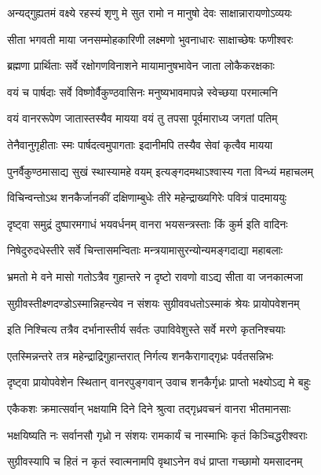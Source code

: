 \twolineshloka
{अन्यद्गुह्यतमं वक्ष्ये रहस्यं शृणु मे सुत}
{रामो न मानुषो देवः साक्षान्नारायणोऽव्ययः} %

\twolineshloka
{सीता भगवती माया जनसम्मोहकारिणी}
{लक्ष्मणो भुवनाधारः साक्षाच्छेषः फणीश्वरः} %

\twolineshloka
{ब्रह्मणा प्रार्थिताः सर्वे रक्षोगणविनाशने}
{मायामानुषभावेन जाता लोकैकरक्षकाः} %

\twolineshloka
{वयं च पार्षदाः सर्वे विष्णोर्वैकुण्ठवासिनः}
{मनुष्यभावमापन्ने स्वेच्छया परमात्मनि} %

\twolineshloka
{वयं वानररूपेण जातास्तस्यैव मायया}
{वयं तु तपसा पूर्वमाराध्य जगतां पतिम्} %

\twolineshloka
{तेनैवानुगृहीताः स्मः पार्षदत्वमुपागताः}
{इदानीमपि तस्यैव सेवां कृत्वैव मायया} %

\twolineshloka
{पुनर्वैकुण्ठमासाद्य सुखं स्थास्यामहे वयम्}
{इत्यङ्गदमथाऽश्वास्य गता विन्ध्यं महाचलम्} %

\twolineshloka
{विचिन्वन्तोऽथ शनकैर्जानकीं दक्षिणाम्बुधेः}
{तीरे महेन्द्राख्यगिरेः पवित्रं पादमाययुः} %

\twolineshloka
{दृष्ट्वा समुद्रं दुष्पारमगाधं भयवर्धनम्}
{वानरा भयसन्त्रस्ताः किं कुर्म इति वादिनः} %

\twolineshloka
{निषेदुरुदधेस्तीरे सर्वे चिन्तासमन्विताः}
{मन्त्रयामासुरन्योन्यमङ्गदाद्या महाबलाः} %

\twolineshloka
{भ्रमतो मे वने मासो गतोऽत्रैव गुहान्तरे}
{न दृष्टो रावणो वाऽद्य सीता वा जनकात्मजा} %

\twolineshloka
{सुग्रीवस्तीक्ष्णदण्डोऽस्मान्निहन्त्येव न संशयः}
{सुग्रीववधतोऽस्माकं श्रेयः प्रायोपवेशनम्} %

\twolineshloka
{इति निश्चित्य तत्रैव दर्भानास्तीर्य सर्वतः}
{उपाविवेशुस्ते सर्वे मरणे कृतनिश्चयाः} %

\twolineshloka
{एतस्मिन्नन्तरे तत्र महेन्द्राद्रिगुहान्तरात्}
{निर्गत्य शनकैरागाद्गृध्रः पर्वतसन्निभः} %

\twolineshloka
{दृष्ट्वा प्रायोपवेशेन स्थितान् वानरपुङ्गवान्}
{उवाच शनकैर्गृध्रः प्राप्तो भक्ष्योऽद्य मे बहुः} %

\twolineshloka
{एकैकशः क्रमात्सर्वान् भक्षयामि दिने दिने}
{श्रुत्वा तद्गृध्रवचनं वानरा भीतमानसाः} %

\twolineshloka
{भक्षयिष्यति नः सर्वानसौ गृध्रो न संशयः}
{रामकार्यं च नास्माभिः कृतं किञ्चिद्धरीश्वराः} %

\twolineshloka
{सुग्रीवस्यापि च हितं न कृतं स्वात्मनामपि}
{वृथाऽनेन वधं प्राप्ता गच्छामो यमसादनम्} %

